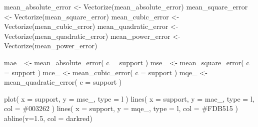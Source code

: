\documentclass[
]{book}
\newenvironment{Shaded}{\begin{snugshade}}{\end{snugshade}}
\newcommand{\AttributeTok}[1]{\textcolor[rgb]{0.77,0.63,0.00}{#1}}
\newcommand{\FloatTok}[1]{\textcolor[rgb]{0.00,0.00,0.81}{#1}}
\newcommand{\FunctionTok}[1]{\textcolor[rgb]{0.00,0.00,0.00}{#1}}
\newcommand{\NormalTok}[1]{#1}
\newcommand{\OtherTok}[1]{\textcolor[rgb]{0.56,0.35,0.01}{#1}}
\newcommand{\StringTok}[1]{\textcolor[rgb]{0.31,0.60,0.02}{#1}}
\theoremstyle{definition}
\theoremstyle{definition}
\theoremstyle{definition}
\theoremstyle{definition}
\theoremstyle{remark}
\begin{document}
\begin{Shaded}
\begin{Highlighting}[]
\NormalTok{mean\_absolute\_error  }\OtherTok{\textless{}{-}} \FunctionTok{Vectorize}\NormalTok{(mean\_absolute\_error)}
\NormalTok{mean\_square\_error    }\OtherTok{\textless{}{-}} \FunctionTok{Vectorize}\NormalTok{(mean\_square\_error)}
\NormalTok{mean\_cubic\_error     }\OtherTok{\textless{}{-}} \FunctionTok{Vectorize}\NormalTok{(mean\_cubic\_error)}
\NormalTok{mean\_quadratic\_error }\OtherTok{\textless{}{-}} \FunctionTok{Vectorize}\NormalTok{(mean\_quadratic\_error)}
\NormalTok{mean\_power\_error     }\OtherTok{\textless{}{-}} \FunctionTok{Vectorize}\NormalTok{(mean\_power\_error)}
\end{Highlighting}
\end{Shaded}

\begin{Shaded}
\begin{Highlighting}[]
\NormalTok{mae\_ }\OtherTok{\textless{}{-}} \FunctionTok{mean\_absolute\_error}\NormalTok{(}
  \AttributeTok{c =}\NormalTok{ support}
\NormalTok{)}
\NormalTok{mse\_ }\OtherTok{\textless{}{-}} \FunctionTok{mean\_square\_error}\NormalTok{(}
  \AttributeTok{c =}\NormalTok{ support}
\NormalTok{  )}
\NormalTok{mce\_ }\OtherTok{\textless{}{-}} \FunctionTok{mean\_cubic\_error}\NormalTok{(}
  \AttributeTok{c =}\NormalTok{ support}
\NormalTok{)}
\NormalTok{mqe\_ }\OtherTok{\textless{}{-}} \FunctionTok{mean\_quadratic\_error}\NormalTok{(}
  \AttributeTok{c =}\NormalTok{ support}
\NormalTok{)}
\end{Highlighting}
\end{Shaded}

\begin{Shaded}
\begin{Highlighting}[]
\FunctionTok{plot}\NormalTok{(}
  \AttributeTok{x =}\NormalTok{ support,}
  \AttributeTok{y =}\NormalTok{ mse\_,}
  \AttributeTok{type =} \StringTok{\textquotesingle{}l\textquotesingle{}}
\NormalTok{)}
\FunctionTok{lines}\NormalTok{(}
  \AttributeTok{x =}\NormalTok{ support, }
  \AttributeTok{y =}\NormalTok{ mae\_, }
  \AttributeTok{type =} \StringTok{\textquotesingle{}l\textquotesingle{}}\NormalTok{, }
  \AttributeTok{col =} \StringTok{\textquotesingle{}\#003262\textquotesingle{}}
\NormalTok{)}
\FunctionTok{lines}\NormalTok{(}
  \AttributeTok{x =}\NormalTok{ support, }
  \AttributeTok{y =}\NormalTok{ mqe\_, }
  \AttributeTok{type =} \StringTok{\textquotesingle{}l\textquotesingle{}}\NormalTok{, }
  \AttributeTok{col =} \StringTok{\textquotesingle{}\#FDB515\textquotesingle{}}
\NormalTok{)}
\FunctionTok{abline}\NormalTok{(}\AttributeTok{v=}\FloatTok{1.5}\NormalTok{, }\AttributeTok{col =} \StringTok{\textquotesingle{}darkred\textquotesingle{}}\NormalTok{)}
\end{Highlighting}
\end{Shaded}
\end{document}
